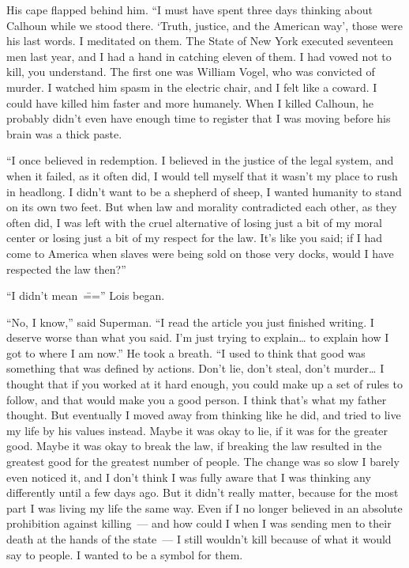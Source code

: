 \documentclass[ebook,12pt]{memoir}
\begin{document}
His cape flapped behind him. ``I must have spent three days thinking
about Calhoun while we stood there. `Truth, justice, and the American
way', those were his last words. I meditated on them. The State of New
York executed seventeen men last year, and I had a hand in catching
eleven of them. I had vowed not to kill, you understand. The first one
was William Vogel, who was convicted of murder. I watched him spasm in
the electric chair, and I felt like a coward. I could have killed him
faster and more humanely. When I killed Calhoun, he probably didn't even
have enough time to register that I was moving before his brain was a
thick paste.

``I once believed in redemption. I believed in the justice of the legal
system, and when it failed, as it often did, I would tell myself that it
wasn't my place to rush in headlong. I didn't want to be a shepherd of
sheep, I wanted humanity to stand on its own two feet. But when law and
morality contradicted each other, as they often did, I was left with the
cruel alternative of losing just a bit of my moral center or losing just
a bit of my respect for the law. It's like you said; if I had come to
America when slaves were being sold on those very docks, would I have
respected the law then?''

``I didn't mean~\==='' Lois began.

``No, I know,'' said Superman. ``I read the article you just finished
writing. I deserve worse than what you said. I'm just trying to
explain\ldots{} to explain how I got to where I am now.'' He took a
breath. ``I used to think that good was something that was defined by
actions. Don't lie, don't steal, don't murder\ldots{} I thought that if
you worked at it hard enough, you could make up a set of rules to
follow, and that would make you a good person. I think that's what my
father thought. But eventually I moved away from thinking like he did,
and tried to live my life by his values instead. Maybe it was okay to
lie, if it was for the greater good. Maybe it was okay to break the law,
if breaking the law resulted in the greatest good for the greatest
number of people. The change was so slow I barely even noticed it, and I
don't think I was fully aware that I was thinking any differently until
a few days ago. But it didn't really matter, because for the most part I
was living my life the same way. Even if I no longer believed in an
absolute prohibition against killing~--- and how could I when I was
sending men to their death at the hands of the state~--- I still
wouldn't kill because of what it would say to people. I wanted to be a
symbol for them.
\end{document}
